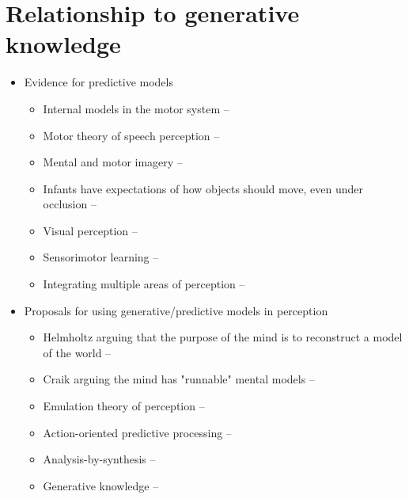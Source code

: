 \documentclass[12pt]{article}
\begin{document}
\section{Relationship to generative knowledge}

\begin{itemize}
\item Evidence for predictive models
    \begin{itemize}
    \item Internal models in the motor system -- \citep{Kawato1999,Flanagan2003}
    \item Motor theory of speech perception -- \citep{Bever2010}
    \item Mental and motor imagery -- \citep{Parsons1994,Kosslyn1988,Hegarty2004}
    \item Infants have expectations of how objects should move, even under occlusion -- \citep{Teglas2011}
    \item Visual perception -- \citep{Weiss2002}
    \item Sensorimotor learning -- \citep{Kording2004}
    \item Integrating multiple areas of perception -- \citep{Ernst2002}
    \end{itemize}

\item Proposals for using generative/predictive models in perception
    \begin{itemize}
    \item Helmholtz arguing that the purpose of the mind is to reconstruct a model of the world -- \citep{Helmholtz1925}
    \item Craik arguing the mind has "runnable" mental models -- \citep{Craik1943}
    \item Emulation theory of perception -- \citep{Grush2004}
    \item Action-oriented predictive processing -- \citep{Clark2013}
    \item Analysis-by-synthesis -- \citep{Halle1959,Halle1962,Bever2010,Yuille2006}
    \item Generative knowledge -- \citep{Battaglia2012}
    \end{itemize}


\end{itemize}
\end{document}
